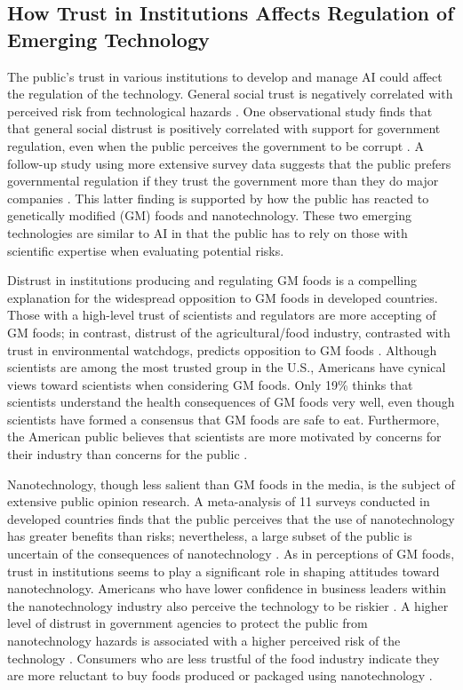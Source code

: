\documentclass{article}
\begin{document}
\subsection{How Trust in Institutions Affects Regulation of Emerging Technology}

The public's trust in various institutions to develop and manage AI could affect the regulation of the technology. General social trust is negatively correlated with perceived risk from technological hazards \citep{siegrist2005perception}. One observational study finds that that general social distrust is positively correlated with support for government regulation, even when the public perceives the government to be corrupt \citep{aghion2010regulation}. A follow-up study using more extensive survey data suggests that the public prefers governmental regulation if they trust the government more than they do major companies \citep{pitlik2015does}. This latter finding is supported by how the public has reacted to genetically modified (GM) foods and nanotechnology. These two emerging technologies are similar to AI in that the public has to rely on those with scientific expertise when evaluating potential risks. 

Distrust in institutions producing and regulating GM foods is a compelling explanation for the widespread opposition to GM foods in developed countries. Those with a high-level trust of scientists and regulators are more accepting of GM foods; in contrast, distrust of the agricultural/food industry, contrasted with trust in environmental watchdogs, predicts opposition to GM foods \citep{siegrist1999causal,siegrist2000influence,lang2005does,marques2015attitudes,olofsson2006attitudes}. Although scientists are among the most trusted group in the U.S., Americans have cynical views toward scientists when considering GM foods. Only 19\% thinks that scientists understand the health consequences of GM foods very well, even though scientists have formed a consensus that GM foods are safe to eat. Furthermore, the American public believes that scientists are more motivated by concerns for their industry than concerns for the public \citep{funk2016new}.

Nanotechnology, though less salient than GM foods in the media, is the subject of extensive public opinion research. A meta-analysis of 11 surveys conducted in developed countries finds that the public perceives that the use of nanotechnology has greater benefits than risks; nevertheless, a large subset of the public is uncertain of the consequences of nanotechnology \citep{satterfield2009anticipating}. As in perceptions of GM foods, trust in institutions seems to play a significant role in shaping attitudes toward nanotechnology. Americans who have lower confidence in business leaders within the nanotechnology industry also perceive the technology to be riskier \citep{macoubrie2004public}. A higher level of distrust in government agencies to protect the public from nanotechnology hazards is associated with a higher perceived risk of the technology \citep{macoubrie2006nanotechnology,siegrist2007laypeople}. Consumers who are less trustful of the food industry indicate they are more reluctant to buy foods produced or packaged using nanotechnology \citep{siegrist2007public}. 
\end{document}
